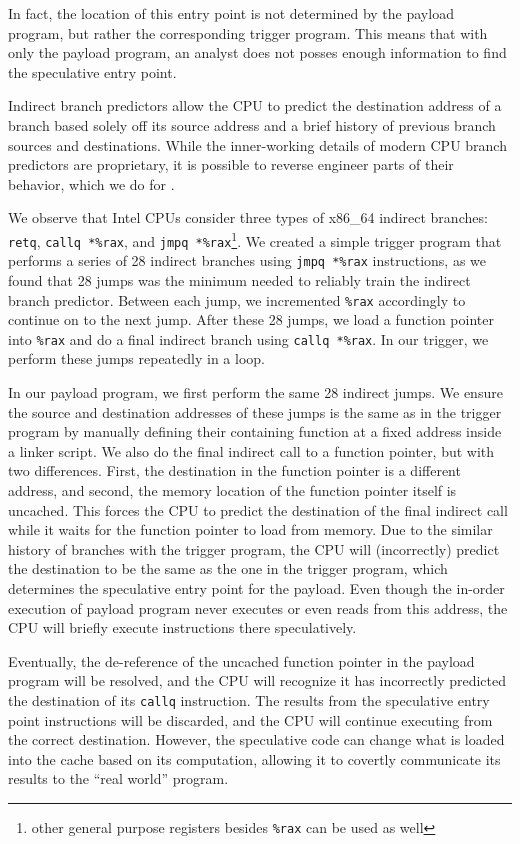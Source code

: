 In fact, the location of this entry point is not determined by the payload
program, but rather the corresponding trigger program. This means that with only
the payload program, an analyst does not posses enough information to find the
speculative entry point.

Indirect branch predictors allow the CPU to predict the destination address of a
branch based solely off its source address and a brief history of previous
branch sources and destinations. While the inner-working details of modern CPU
branch predictors are proprietary, it is possible to reverse engineer parts of
their behavior, which we do for \speculake.

We observe that Intel CPUs consider three types of x86\_64 indirect branches:
\texttt{retq}, \texttt{callq *\%rax}, and \texttt{jmpq *\%rax}\footnote{other
general purpose registers besides \texttt{\%rax} can be used as well}.
We created a simple trigger program that performs a series of 28 indirect
branches
using \texttt{jmpq *\%rax} instructions, as we found that 28 jumps was the minimum
needed to reliably train the indirect branch predictor. 
Between each jump, we incremented
\texttt{\%rax} accordingly to continue on to the next jump. After these 28
jumps, we load a function pointer into \texttt{\%rax} and do a final indirect
branch using \texttt{callq *\%rax}. In our trigger, we perform these jumps
        repeatedly in a loop.

In our payload program, we first perform the same 28 indirect jumps. We ensure
the source and destination addresses of these jumps is the same as in the trigger program by
manually defining their containing function at a fixed address inside a linker
script. We also do the final indirect call to a function pointer, but with two
differences. First, the destination in the function pointer is a different
address, and second, the memory location of the function pointer itself is uncached.
This forces the CPU to predict the destination of the final indirect call while it
waits for the function pointer to load from memory. Due to the similar
history of branches with the trigger program,
the CPU will (incorrectly) predict the destination to be the same as the one in
the trigger program, which determines the speculative entry point for the
payload. Even though the in-order execution of
payload program never executes or even reads from this address, the CPU will
briefly execute instructions there speculatively.

Eventually, the de-reference of the uncached function pointer in the payload
program will be resolved, and the CPU will recognize it has incorrectly
predicted the destination of its \texttt{callq} instruction. The results from
the speculative entry point instructions will be discarded, and the CPU will
continue executing from the correct destination. However, the speculative code
can change what is loaded into the cache based on its computation, allowing it
to covertly communicate its results to the ``real world'' program.




